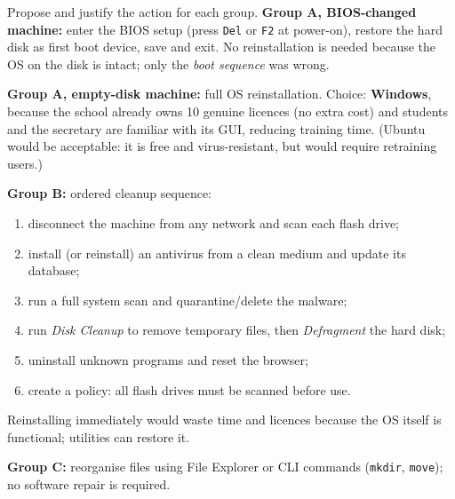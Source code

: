 \documentclass[11pt]{article}
\begin{document}
\begin{exoresolu}
Propose and justify the action for each group.
\tcblower
\textbf{Group A, BIOS-changed machine:} enter the BIOS setup (press \texttt{Del} or \texttt{F2} at power-on), restore the hard disk as first boot device, save and exit. No reinstallation is needed because the OS on the disk is intact; only the \emph{boot sequence} was wrong.

\textbf{Group A, empty-disk machine:} full OS reinstallation. Choice: \textbf{Windows}, because the school already owns 10 genuine licences (no extra cost) and students and the secretary are familiar with its GUI, reducing training time. (Ubuntu would be acceptable: it is free and virus-resistant, but would require retraining users.)

\textbf{Group B:} ordered cleanup sequence:
\begin{enumerate}
\item disconnect the machine from any network and scan each flash drive;
\item install (or reinstall) an antivirus from a clean medium and update its database;
\item run a full system scan and quarantine/delete the malware;
\item run \emph{Disk Cleanup} to remove temporary files, then \emph{Defragment} the hard disk;
\item uninstall unknown programs and reset the browser;
\item create a policy: all flash drives must be scanned before use.
\end{enumerate}
Reinstalling immediately would waste time and licences because the OS itself is functional; utilities can restore it.

\textbf{Group C:} reorganise files using File Explorer or CLI commands (\texttt{mkdir}, \texttt{move}); no software repair is required.
\end{exoresolu}
\end{document}
